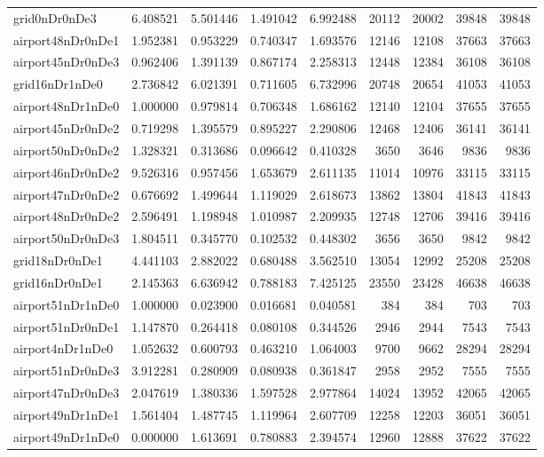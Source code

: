 \begin{longtable}{|l|r|r|r|r|r|r|r|r|}
grid0nDr0nDe3 & 6.408521 & 5.501446 & 1.491042 & 6.992488 & 20112 & 20002 & 39848 & 39848 \\
airport48nDr0nDe1 & 1.952381 & 0.953229 & 0.740347 & 1.693576 & 12146 & 12108 & 37663 & 37663 \\
airport45nDr0nDe3 & 0.962406 & 1.391139 & 0.867174 & 2.258313 & 12448 & 12384 & 36108 & 36108 \\
grid16nDr1nDe0 & 2.736842 & 6.021391 & 0.711605 & 6.732996 & 20748 & 20654 & 41053 & 41053 \\
airport48nDr1nDe0 & 1.000000 & 0.979814 & 0.706348 & 1.686162 & 12140 & 12104 & 37655 & 37655 \\
airport45nDr0nDe2 & 0.719298 & 1.395579 & 0.895227 & 2.290806 & 12468 & 12406 & 36141 & 36141 \\
airport50nDr0nDe2 & 1.328321 & 0.313686 & 0.096642 & 0.410328 & 3650 & 3646 & 9836 & 9836 \\
airport46nDr0nDe2 & 9.526316 & 0.957456 & 1.653679 & 2.611135 & 11014 & 10976 & 33115 & 33115 \\
airport47nDr0nDe2 & 0.676692 & 1.499644 & 1.119029 & 2.618673 & 13862 & 13804 & 41843 & 41843 \\
airport48nDr0nDe2 & 2.596491 & 1.198948 & 1.010987 & 2.209935 & 12748 & 12706 & 39416 & 39416 \\
airport50nDr0nDe3 & 1.804511 & 0.345770 & 0.102532 & 0.448302 & 3656 & 3650 & 9842 & 9842 \\
grid18nDr0nDe1 & 4.441103 & 2.882022 & 0.680488 & 3.562510 & 13054 & 12992 & 25208 & 25208 \\
grid16nDr0nDe1 & 2.145363 & 6.636942 & 0.788183 & 7.425125 & 23550 & 23428 & 46638 & 46638 \\
airport51nDr1nDe0 & 1.000000 & 0.023900 & 0.016681 & 0.040581 & 384 & 384 & 703 & 703 \\
airport51nDr0nDe1 & 1.147870 & 0.264418 & 0.080108 & 0.344526 & 2946 & 2944 & 7543 & 7543 \\
airport4nDr1nDe0 & 1.052632 & 0.600793 & 0.463210 & 1.064003 & 9700 & 9662 & 28294 & 28294 \\
airport51nDr0nDe3 & 3.912281 & 0.280909 & 0.080938 & 0.361847 & 2958 & 2952 & 7555 & 7555 \\
airport47nDr0nDe3 & 2.047619 & 1.380336 & 1.597528 & 2.977864 & 14024 & 13952 & 42065 & 42065 \\
airport49nDr1nDe1 & 1.561404 & 1.487745 & 1.119964 & 2.607709 & 12258 & 12203 & 36051 & 36051 \\
airport49nDr1nDe0 & 0.000000 & 1.613691 & 0.780883 & 2.394574 & 12960 & 12888 & 37622 & 37622 \\

\end{longtable}
